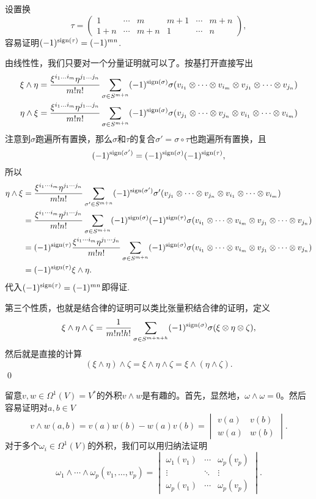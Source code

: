 	 设置换
	\[
		\tau=
		\begin{pmatrix}
			1& \cdots & m & m+1 &\cdots &m+n\\
			1+n& \cdots & m+n & 1 &\cdots &n
		\end{pmatrix},
	\]
	容易证明$(-1)^{\operatorname{sign}(\tau)}=(-1)^{mn}$.

	由线性性，我们只要对一个分量证明就可以了。按基打开直接写出
	\[
		\begin{split}
			\xi \wedge \eta&=\frac{\xi^{i_1\dots i_m}\eta^{j_1 \dots j_n}}{m!n!}\sum_{\sigma\in S^{m+n}}(-1)^{\operatorname{sign}(\sigma)}\sigma(v_{i_1}\otimes \cdots \otimes v_{i_m}\otimes v_{j_1}\otimes \cdots \otimes v_{j_n})\\
			\eta \wedge \xi&=\frac{\xi^{i_1\dots i_m}\eta^{j_1 \dots j_n}}{m!n!}\sum_{\sigma\in S^{m+n}}(-1)^{\operatorname{sign}(\sigma)}\sigma(v_{j_1}\otimes \cdots \otimes v_{j_n}\otimes v_{i_1}\otimes \cdots \otimes v_{i_m})
		\end{split}
	\]
	注意到$\sigma$跑遍所有置换，那么$\sigma$和$\tau$的复合$\sigma'=\sigma\circ\tau$也跑遍所有置换，且
	\[(-1)^{\operatorname{sign}(\sigma')}=(-1)^{\operatorname{sign}(\sigma)}(-1)^{\operatorname{sign}(\tau)},\]所以
	\[
		\begin{split}
			\eta \wedge \xi&=\frac{\xi^{i_1\cdots i_m}\eta^{j_1 \cdots j_n}}{m!n!}\sum_{\sigma'\in S^{m+n}}(-1)^{\operatorname{sign}(\sigma')}\sigma'(v_{j_1}\otimes \cdots \otimes v_{j_n}\otimes v_{i_1}\otimes \cdots \otimes v_{i_m})\\
			&=\frac{\xi^{i_1\cdots i_m}\eta^{j_1 \cdots j_n}}{m!n!}\sum_{\sigma\in S^{m+n}}(-1)^{\operatorname{sign}(\sigma)}(-1)^{\operatorname{sign}(\tau)}\sigma(v_{i_1}\otimes \cdots \otimes v_{i_m}\otimes v_{j_1}\otimes \cdots \otimes v_{j_n})\\
			&=(-1)^{\operatorname{sign}(\tau)}\frac{\xi^{i_1\cdots i_m}\eta^{j_1 \cdots j_n}}{m!n!}\sum_{\sigma\in S^{m+n}}(-1)^{\operatorname{sign}(\sigma)}\sigma(v_{i_1}\otimes \cdots \otimes v_{i_m}\otimes v_{j_1}\otimes \cdots \otimes v_{j_n})\\
			&=(-1)^{\operatorname{sign}(\tau)} \xi \wedge \eta.
		\end{split}
	\]
	代入$(-1)^{\operatorname{sign}(\tau)}=(-1)^{mn}$即得证.

	第三个性质，也就是结合律的证明可以类比张量积结合律的证明，定义
	\[
		\xi \wedge \eta\wedge \zeta=\frac{1}{m!n!h!}\sum_{\sigma\in S^{m+n+h}}(-1)^{\operatorname{sign}(\sigma)}\sigma(\xi \otimes \eta \otimes \zeta),
	\]
	然后就是直接的计算
	\[
		(\xi \wedge \eta) \wedge \zeta=\xi \wedge \eta\wedge \zeta=\xi \wedge (\eta \wedge \zeta).
	\]
	\qed

\para 留意$v,w\in \Omega^1(V)=V^*$的外积$v\wedge w$是有趣的。首先，显然地，$\omega\wedge\omega=0$。然后容易证明对$a,b\in V$
\[
	v\wedge w(a,b)=v(a)w(b)- w(a)v(b)=\begin{vmatrix}v(a)&v(b)\\w(a)&w(b)\end{vmatrix}.
\]
对于多个$\omega_i \in \Omega^1(V)$的外积，我们可以用归纳法证明
\[
	\omega_1\wedge \cdots \wedge\omega_p(v_1,\dots,v_p)=
	\begin{vmatrix}
		\omega_1(v_1)&\cdots&\omega_p(v_p)\\
		\vdots&\ddots&\vdots\\
		\omega_p(v_1)&\cdots&\omega_p(v_p)
	\end{vmatrix}.
\]

